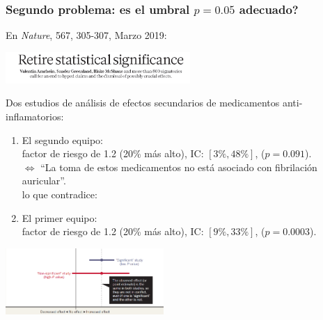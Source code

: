 \documentclass[9pt]{beamer}
\begin{document}
\begin{frame}
    \frametitle{Segundo problema: es el umbral $p = 0.05$ adecuado?}
  
  \onslide<+->
    En \textit{Nature}, 567, 305-307, Marzo 2019:
    \begin{center}
      \includegraphics[width=7cm]{images/retire_statistical_significance}
    \end{center}
    \onslide<+->
    Dos estudios de análisis de efectos secundarios de medicamentos
    anti-inflamatorios:
    \begin{enumerate}
    \item El segundo equipo:\\ factor de riesgo de 1.2 (20\% más alto),
      IC: $[3\%, 48\%]$, ($p = 0.091$).\\
      \onslide<+-> $\Leftrightarrow$ ``La toma de estos medicamentos
      no está asociado con fibrilación auricular''. \onslide<+->
      \\ lo que contradice:
    \item<+-> El primer equipo:\\ factor de riesgo de 1.2 (20\% más alto),
      IC: $[9\%, 33\%]$, ($p = 0.0003$).\\
    \end{enumerate}
    \onslide<+->
      \begin{center}
      \includegraphics[width=6cm]{images/retire_statistical_significance_plot_cropped}
    \end{center}
  \end{frame}
\end{document}
